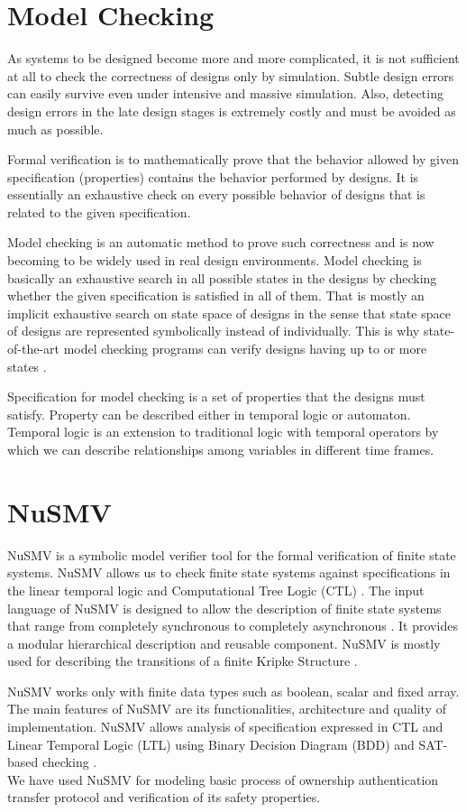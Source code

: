 \documentclass[letterpaper]{article}
\begin{document}
\section{Model Checking}
\label{c}
As systems to be designed become more and more complicated, it is not sufficient at all to check the correctness of designs only by simulation. Subtle design errors can easily survive even under intensive and massive simulation. Also, detecting design errors in the late design stages is extremely costly and must be avoided as much as possible.
\par Formal verification is to mathematically prove that the behavior allowed by given specification (properties) contains
the behavior performed by designs. It is essentially an exhaustive check on every possible behavior of designs that is related to the given specification.
\par Model checking is an automatic method to prove such correctness and is now becoming to be widely used in real design environments. Model checking is basically an exhaustive search in all possible states in the designs by checking whether the given specification is satisfied in all of them. That is mostly an implicit exhaustive search on state space of designs in the sense that state space of designs are represented symbolically instead of individually. This is why state-of-the-art model checking programs can verify designs having up to  or more states \cite{5}.
\par Specification for model checking is a set of properties that the designs must satisfy. Property can be described either in temporal logic or automaton. Temporal logic is an extension to traditional logic with temporal operators by which we can describe relationships among variables in different time frames. 

\section{NuSMV}
\label{d}
NuSMV is a symbolic model verifier tool for the formal verification of finite state systems. NuSMV allows us to check finite state systems against specifications in the linear temporal logic and Computational Tree Logic (CTL) \cite{6}. The input language of NuSMV is designed to allow the description of finite state systems that range from completely synchronous to completely asynchronous \cite{7}. It provides a modular hierarchical description and reusable component. NuSMV is mostly used for describing the transitions of a finite Kripke Structure \cite{kp}.
\par	NuSMV works only with finite data types such as boolean, scalar and fixed array. The main features of NuSMV are its functionalities, architecture and quality of implementation. NuSMV allows analysis of specification expressed in CTL and Linear Temporal Logic (LTL) using Binary Decision Diagram (BDD) and SAT-based checking \cite{6}.\\
	 We have used NuSMV for modeling basic process of ownership authentication transfer protocol and verification of its safety properties.
\end{document}
